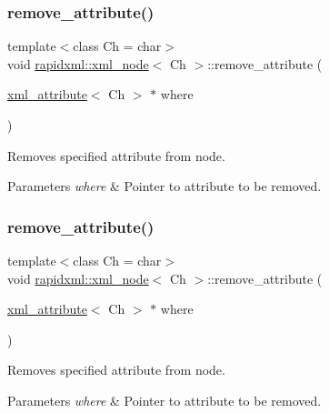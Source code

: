 \subsubsection{\texorpdfstring{remove\+\_\+attribute()}{remove\_attribute()}\hspace{0.1cm}{\footnotesize\ttfamily [1/2]}}
{\footnotesize\ttfamily template$<$class Ch = char$>$ \\
void \mbox{\hyperlink{classrapidxml_1_1xml__node}{rapidxml\+::xml\+\_\+node}}$<$ Ch $>$\+::remove\+\_\+attribute (\begin{DoxyParamCaption}\item[{\mbox{\hyperlink{classrapidxml_1_1xml__attribute}{xml\+\_\+attribute}}$<$ Ch $>$ $\ast$}]{where }\end{DoxyParamCaption})\hspace{0.3cm}{\ttfamily [inline]}}

Removes specified attribute from node. 
\begin{DoxyParams}{Parameters}
{\em where} & Pointer to attribute to be removed. \\
\hline
\end{DoxyParams}
\mbox{\label{classrapidxml_1_1xml__node_a6f97b1b4f46a94a4587915df3c0c6b57}} 
\subsubsection{\texorpdfstring{remove\+\_\+attribute()}{remove\_attribute()}\hspace{0.1cm}{\footnotesize\ttfamily [2/2]}}
{\footnotesize\ttfamily template$<$class Ch = char$>$ \\
void \mbox{\hyperlink{classrapidxml_1_1xml__node}{rapidxml\+::xml\+\_\+node}}$<$ Ch $>$\+::remove\+\_\+attribute (\begin{DoxyParamCaption}\item[{\mbox{\hyperlink{classrapidxml_1_1xml__attribute}{xml\+\_\+attribute}}$<$ Ch $>$ $\ast$}]{where }\end{DoxyParamCaption})\hspace{0.3cm}{\ttfamily [inline]}}

Removes specified attribute from node. 
\begin{DoxyParams}{Parameters}
{\em where} & Pointer to attribute to be removed. \\
\hline
\end{DoxyParams}
\mbox{\label{classrapidxml_1_1xml__node_aa95192d2a165cca16c551ed2a2a06aec}} 

